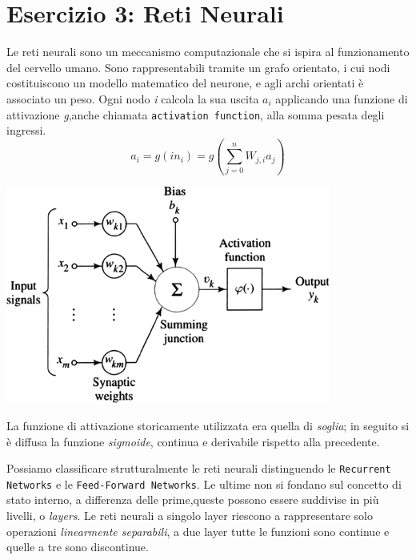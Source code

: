 {		\section{Esercizio 3: Reti Neurali}
			\label{sec: es3}
			Le reti neurali sono un meccanismo computazionale che si ispira al funzionamento del cervello umano. Sono rappresentabili tramite un grafo orientato, i cui nodi costituiscono un modello matematico del neurone, e agli archi orientati è associato un peso. Ogni nodo \textit{i} calcola la sua uscita $a_{i}$ applicando una funzione di attivazione \textit{g},anche chiamata \texttt{activation function}, alla somma pesata degli ingressi.%
			\begin{equation}
			a_{i} = g(in_{i}) =g( \sum_{j=0}^n W_{j,i} a_{j})
			\end{equation}
			\medskip
			\begin{center}
				\includegraphics[width=0.8\textwidth, height=0.3\textheight]{neurone.jpg}
			\end{center}
			La funzione di attivazione storicamente utilizzata era quella di \emph{soglia}; in seguito si è diffusa la funzione \emph{sigmoide}, continua e derivabile rispetto alla precedente.\par
			Possiamo classificare strutturalmente le reti neurali distinguendo le \texttt{Recurrent Networks} e le \texttt{Feed-Forward Networks}. Le ultime non si fondano sul concetto di stato interno, a differenza delle prime,queste possono essere suddivise in più livelli, o \emph{layers}. Le reti neurali a singolo layer riescono a rappresentare solo operazioni \emph{linearmente separabili}, a due layer tutte le funzioni sono continue e quelle a tre sono discontinue.
			\begin{center}

\end{center}}
